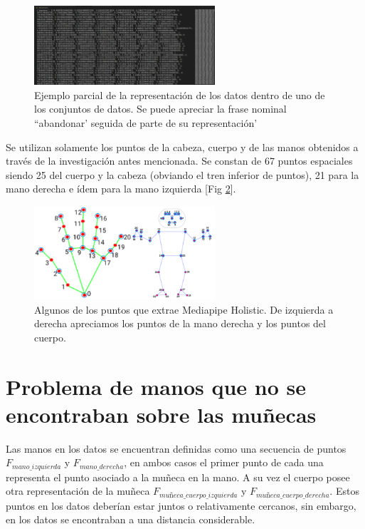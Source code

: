 \begin{figure}[ht!]
    \centering
    \includegraphics[width=0.6\textwidth]{Graphics/data_example.png}
    \caption{Ejemplo parcial de la representación de los datos dentro de uno de los conjuntos de datos. Se puede apreciar la frase nominal ``abandonar' seguida de parte de su representación'}
    \label{fig:data_example}
\end{figure}


Se utilizan solamente los puntos de la cabeza, cuerpo y de las manos obtenidos a través de la investigación antes mencionada. Se constan de 67 puntos espaciales siendo 25 del cuerpo y la cabeza (obviando el tren inferior de puntos), 21 para la mano derecha e ídem para la mano izquierda [Fig \ref{fig:points}]. 

\begin{figure}[ht!]
    \centering
    \includegraphics[width=0.6\textwidth]{Graphics/points.png}
    \caption{Algunos de los puntos que extrae Mediapipe Holistic. De izquierda a derecha apreciamos los puntos de la mano derecha y los puntos del cuerpo.}
    \label{fig:points}
\end{figure}

\section{Problema de manos que no se encontraban sobre las muñecas}

Las manos en los datos se encuentran definidas como una secuencia de puntos $F_{mano\_izquierda}$ y 
$F_{mano\_derecha}$, en ambos casos el primer punto de cada una representa el punto asociado a la muñeca 
en la mano. A su vez el cuerpo posee otra representación de la muñeca $F_{muñeca\_cuerpo\_izquierda}$ y $F_{muñeca\_cuerpo\_derecha}$. 
Estos puntos en los datos deberían
estar juntos o relativamente cercanos, sin embargo, en los datos se encontraban a una distancia considerable.

